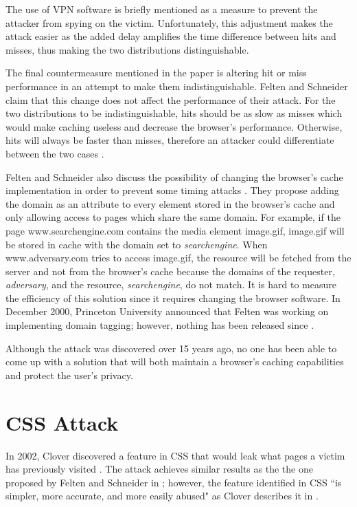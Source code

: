 \documentclass[10pt,a4paper,twoside]{book}
\begin{document}
The use of VPN software is briefly mentioned as a measure to prevent the attacker from spying on the victim. Unfortunately, this adjustment makes the attack easier as the added delay amplifies the time difference between hits and misses, thus making the two distributions distinguishable. 

The final countermeasure mentioned in the paper is altering hit or miss performance in an attempt to make them indistinguishable. Felten and Schneider claim that this change does not affect the performance of their attack. For the two distributions to be indistinguishable, hits should be as slow as misses which would make caching useless and decrease the browser's performance. Otherwise, hits will always be faster than misses, therefore an attacker could differentiate between the two cases \cite{felten2000timing}. 

Felten and Schneider also discuss the possibility of changing the browser's cache implementation in order to prevent some timing attacks \cite{felten2000timing}. They propose adding the domain as an attribute to every element stored in the browser's cache and only allowing access to pages which share the same domain. For example, if the page www.searchengine.com contains the media element image.gif, image.gif will be stored in cache with the domain set to \textit{searchengine}. When www.adversary.com tries to access image.gif, the resource will be fetched from the server and not from the browser's cache because the domains of the requester, \textit{adversary}, and the resource, \textit{searchengine}, do not match. It is hard to measure the efficiency of this solution since it requires changing the browser software. In December 2000, Princeton University announced that Felten was working on implementing domain tagging; however, nothing has been released since \cite{princetonunifelten}.

Although the attack was discovered over 15 years ago, no one has been able to come up with a solution that will both maintain a browser's caching capabilities and protect the user's privacy. 

\section{CSS Attack}

In 2002, Clover discovered a feature in CSS that would leak what pages a victim has previously visited \cite{cssvisited}. The attack achieves similar results as the the one proposed by Felten and Schneider in \cite{felten2000timing}; however, the feature identified in CSS ``is simpler, more accurate, and more easily abused" as Clover describes it in \cite{cssvisited}.
\end{document}
